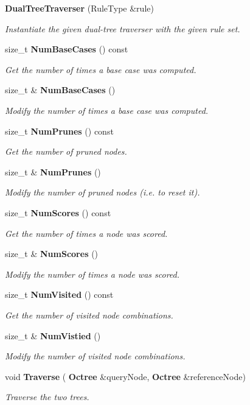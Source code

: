 \begin{DoxyCompactItemize}
\item 
\textbf{ Dual\+Tree\+Traverser} (Rule\+Type \&rule)
\begin{DoxyCompactList}\small\item\em Instantiate the given dual-\/tree traverser with the given rule set. \end{DoxyCompactList}\item 
size\+\_\+t \textbf{ Num\+Base\+Cases} () const
\begin{DoxyCompactList}\small\item\em Get the number of times a base case was computed. \end{DoxyCompactList}\item 
size\+\_\+t \& \textbf{ Num\+Base\+Cases} ()
\begin{DoxyCompactList}\small\item\em Modify the number of times a base case was computed. \end{DoxyCompactList}\item 
size\+\_\+t \textbf{ Num\+Prunes} () const
\begin{DoxyCompactList}\small\item\em Get the number of pruned nodes. \end{DoxyCompactList}\item 
size\+\_\+t \& \textbf{ Num\+Prunes} ()
\begin{DoxyCompactList}\small\item\em Modify the number of pruned nodes (i.\+e. to reset it). \end{DoxyCompactList}\item 
size\+\_\+t \textbf{ Num\+Scores} () const
\begin{DoxyCompactList}\small\item\em Get the number of times a node was scored. \end{DoxyCompactList}\item 
size\+\_\+t \& \textbf{ Num\+Scores} ()
\begin{DoxyCompactList}\small\item\em Modify the number of times a node was scored. \end{DoxyCompactList}\item 
size\+\_\+t \textbf{ Num\+Visited} () const
\begin{DoxyCompactList}\small\item\em Get the number of visited node combinations. \end{DoxyCompactList}\item 
size\+\_\+t \& \textbf{ Num\+Vistied} ()
\begin{DoxyCompactList}\small\item\em Modify the number of visited node combinations. \end{DoxyCompactList}\item 
void \textbf{ Traverse} (\textbf{ Octree} \&query\+Node, \textbf{ Octree} \&reference\+Node)
\begin{DoxyCompactList}\small\item\em Traverse the two trees. \end{DoxyCompactList}\end{DoxyCompactItemize}


